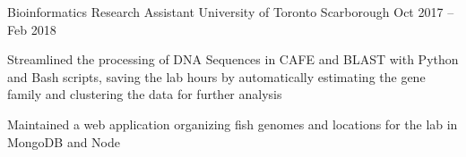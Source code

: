 \begin{cventries}
  \cventry
    {Bioinformatics Research Assistant}
    {University of Toronto}
    {Scarborough}
    {Oct 2017 -- Feb 2018}
    {}
    {
      \begin{cvitems}
        \item {Streamlined the processing of DNA Sequences in CAFE and BLAST with Python and Bash scripts, saving the lab hours by automatically estimating the gene family and clustering the data for further analysis}
        \item {Maintained a web application organizing fish genomes and locations for the lab in MongoDB and Node}
      \end{cvitems}
    }
\end{cventries}
